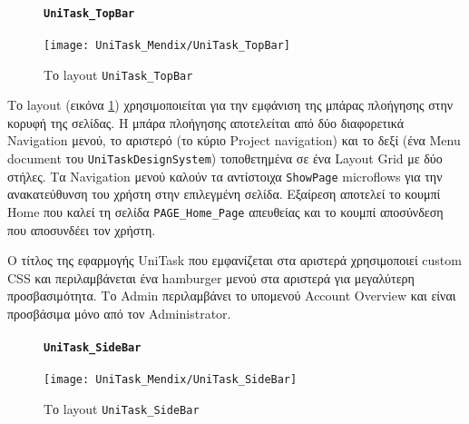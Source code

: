                 \begin{figure}[H] \noindent
                    \paragraph{\texttt{UniTask\_TopBar}}
                    \begin{center}
                        \texttt{[image: UniTask\_Mendix/UniTask\_TopBar]}
                        \caption{\centering Το layout \texttt{UniTask\_TopBar}}
                        \label{fig:unitask_UniTask_TopBar}
                    \end{center}
                \end{figure}

                Το layout (εικόνα \ref{fig:unitask_UniTask_TopBar}) χρησιμοποιείται για την εμφάνιση της μπάρας πλοήγησης στην κορυφή της σελίδας. Η μπάρα πλοήγησης αποτελείται από δύο διαφορετικά Navigation μενού, το αριστερό (το κύριο Project navigation) και το δεξί (ένα Menu document του \texttt{UniTaskDesignSystem}) τοποθετημένα σε ένα Layout Grid με δύο στήλες. Τα Navigation μενού καλούν τα αντίστοιχα \texttt{ShowPage} microflows για την ανακατεύθυνση του χρήστη στην επιλεγμένη σελίδα. Εξαίρεση αποτελεί το κουμπί {\Zona Home} που καλεί τη σελίδα \texttt{PAGE\_Home\_Page} απευθείας και το κουμπί {\Zonaa αποσύνδεση} που αποσυνδέει τον χρήστη.

                Ο τίτλος της εφαρμογής {\ZonaSB UniTask} που εμφανίζεται στα αριστερά χρησιμοποιεί custom CSS και περιλαμβάνεται ένα hamburger μενού στα αριστερά για μεγαλύτερη προσβασιμότητα. Το {\Zone Admin} περιλαμβάνει το υπομενού {\Zona Account Overview} και είναι προσβάσιμα μόνο από τον Administrator.

                \begin{figure}[H] \noindent
                    \paragraph{\texttt{UniTask\_SideBar}}
                    \begin{center}
                        \texttt{[image: UniTask\_Mendix/UniTask\_SideBar]}
                        \caption{\centering Το layout \texttt{UniTask\_SideBar}}
                        \label{fig:unitask_UniTask_SideBar}
                    \end{center}
                \end{figure}\textbf{}

